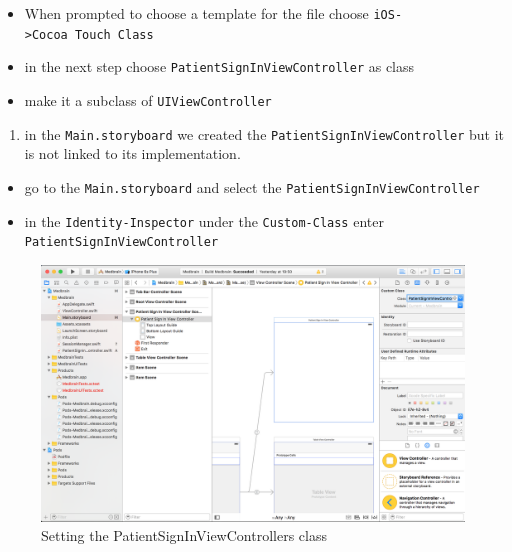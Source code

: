 \documentclass{article}
\begin{document}
\begin{itemize}

\item
  When prompted to choose a template for the file choose
  \texttt{iOS-\textgreater{}Cocoa\ Touch\ Class}
\item
  in the next step choose \texttt{PatientSignInViewController} as class
\item
  make it a subclass of \texttt{UIViewController}
\end{itemize}

\begin{enumerate}
\def\labelenumi{\arabic{enumi}.}
\setcounter{enumi}{1}

\item
  in the \texttt{Main.storyboard} we created the
  \texttt{PatientSignInViewController} but it is not linked to its
  implementation.
\end{enumerate}

\begin{itemize}

\item
  go to the \texttt{Main.storyboard} and select the
  \texttt{PatientSignInViewController}
\item
  in the \texttt{Identity-Inspector} under the \texttt{Custom-Class}
  enter \texttt{PatientSignInViewController}
\end{itemize}



\begin{figure}[H]
\centering
\includegraphics[width=\linewidth]{resources/step5/set_signin_class.png}
\caption{Setting the PatientSignInViewControllers class}
\label{fig:set_signin_class}
\end{figure}
\end{document}
